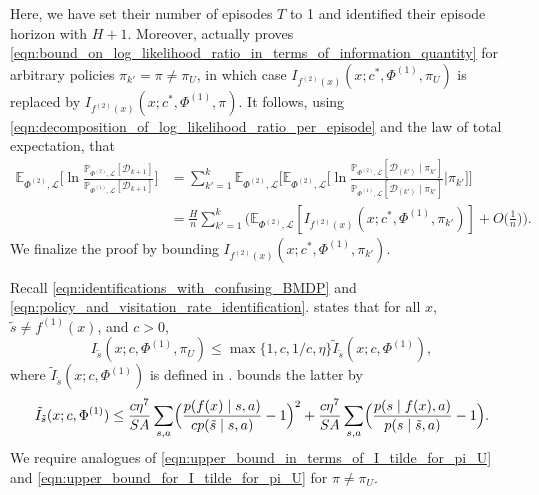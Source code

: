 \documentclass[11pt]{article}
\newcommand{\mcD}{\mathcal{D}}
\newcommand{\mcL}{\mathcal{L}}
\newcommand{\mbbP}{\mathbb{P}}
\newcommand{\mbbE}{\mathbb{E}}
\theoremstyle{definition}
\theoremstyle{definition}
\begin{document}
Here, we have set their number of episodes $T$ to 1 and identified their episode horizon with $H+1$.
Moreover, \cite{Jedra:2022} actually proves \eqref{eqn:bound_on_log_likelihood_ratio_in_terms_of_information_quantity} for arbitrary policies $\pi_{k'} = \pi \neq \pi_U$, in which case $I_{f^{(2)}(x)}(x;c^*,\Phi^{(1)},\pi_{U})$ is replaced by $I_{f^{(2)}(x)}(x;c^*,\Phi^{(1)},\pi)$.
It follows, using \eqref{eqn:decomposition_of_log_likelihood_ratio_per_episode} and the law of total expectation, that
\begin{align}
	\mbbE_{\Phi^{(2)},\mcL}\biggl[
		\ln\frac{\mbbP_{\Phi^{(2)},\mcL}[\mcD_{k+1}]}{\mbbP_{\Phi^{(1)},\mcL}[\mcD_{k+1}]}
		\biggr]
	 &
	=
	\sum_{k'=1}^k
	\mbbE_{\Phi^{(2)},\mcL}\biggl[
	\mbbE_{\Phi^{(2)},\mcL}\biggl[
	\ln\frac{\mbbP_{\Phi^{(2)},\mcL}[\mcD_{(k')}\mid \pi_{k' }]}{\mbbP_{\Phi^{(1)},\mcL}[\mcD_{(k')}\mid \pi_{k' }]}
	\bigg| \pi_{k'}
	\biggr]
	\biggr]
	\label{eqn:log_likelihood_ratio_partial_bound}
	\\
	 &
	=
	\frac{H}{n}
	\sum_{k'=1}^k
	\biggl(\mbbE_{\Phi^{(2)},\mcL}[I_{f^{(2)}(x)}(x;c^*,\Phi^{(1)},\pi_{k'})]+O\biggl(\frac{1}{n}\biggr)\biggr)
	.
	\nonumber
\end{align}
We finalize the proof by bounding $I_{f^{(2)}(x)}(x;c^*,\Phi^{(1)},\pi_{k'})$.

Recall \eqref{eqn:identifications_with_confusing_BMDP} and \eqref{eqn:policy_and_visitation_rate_identification}.
\cite[Proposition 11]{Jedra:2022} states that for all $x$, $\tilde{s}\neq f^{(1)}(x)$, and $c>0$,
\begin{equation}
	\label{eqn:upper_bound_in_terms_of_I_tilde_for_pi_U}
	I_{\tilde{s}}(x;c,\Phi^{(1)},\pi_U)
	\leq
	\max\{1,c,1/c,\eta\}\tilde{I}_{\tilde{s}}(x;c,\Phi^{(1)})
	,
\end{equation}
where $\tilde{I}_{\tilde{s}}(x;c,\Phi^{(1)})$ is defined in \cite[(37)--(39)]{Jedra:2022}.
\cite[Proposition 12]{Jedra:2022} bounds the latter by
\begin{equation}
	\label{eqn:upper_bound_for_I_tilde_for_pi_U}
	\tilde{I}_{\tilde{s}}(x;c,\Phi^{(1)})
	\leq
	\frac{c\eta^7}{SA}\sum_{s,a}\Bigl(
		\frac{p(f(x)\mid s,a)}{cp(\tilde{s}\mid s,a)}-1
	\Bigr)^2
	+
	\frac{c\eta^7}{SA}\sum_{s,a}\Bigl(
		\frac{p(s\mid f(x),a)}{p(s\mid \tilde{s},a)}-1
	\Bigr)
	.
\end{equation}
We require analogues of \eqref{eqn:upper_bound_in_terms_of_I_tilde_for_pi_U} and \eqref{eqn:upper_bound_for_I_tilde_for_pi_U} for $\pi\neq \pi_U$.
\end{document}
